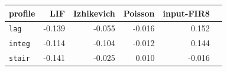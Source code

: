 \begin{tabular}{lrrrrr}
\toprule
profile & LIF & Izhikevich & Poisson & input-FIR8 \\
\midrule
\texttt{lag} & -0.139 & -0.055 & -0.016 & 0.152 \\
\texttt{integ} & -0.114 & -0.104 & -0.012 & 0.144 \\
\texttt{stair} & -0.141 & -0.025 & 0.010 & -0.016 \\
\bottomrule
\end{tabular}
